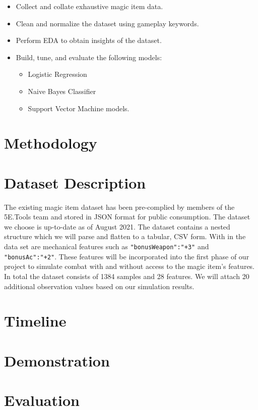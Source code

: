\documentclass[12pt]{diazessay}
\begin{document}
\begin{itemize}
	
	\item Collect and collate exhaustive magic item data.
	\item Clean and normalize the dataset using gameplay keywords.
	\item Perform EDA to obtain insights of the dataset.
	\item Build, tune, and evaluate the following models:
	\begin{itemize}
		\item Logistic Regression
		\item Naive Bayes Classifier
		\item Support Vector Machine models.
	\end{itemize}

\end{itemize}

\clearpage

\section*{Methodology}

\section*{Dataset Description}

The existing magic item dataset \cite{Mirror5eTools} has been pre-complied by members of the 5E.Tools team and stored in JSON format for public consumption.
The dataset we choose is up-to-date as of August 2021.
The dataset contains a nested structure which we will parse and flatten to a tabular, CSV form.
With in the data set are mechanical features such as \texttt{"bonusWeapon":"+3"} and \texttt{"bonusAc":"+2"}.
These features will be incorporated into the first phase of our project to simulate combat with and without access to the magic item's features.
In total the dataset consists of 1384 samples and 28 features.
We will attach 20 additional observation values based on our simulation results.

\section*{Timeline}

\section*{Demonstration}

\section*{Evaluation}

\clearpage



\end{document}

